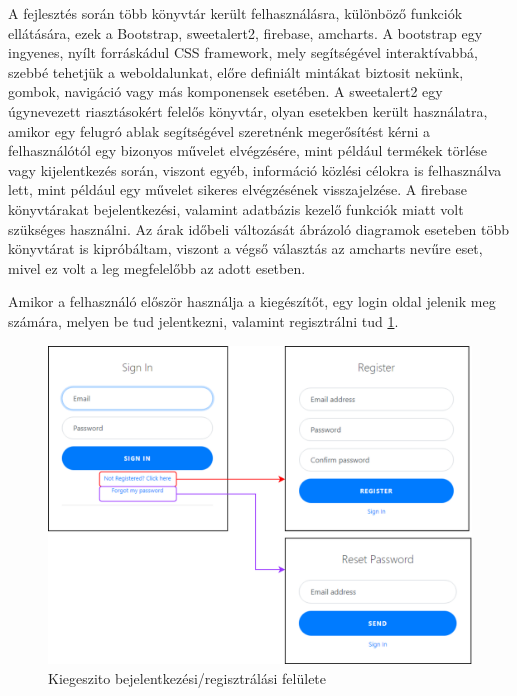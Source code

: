 A fejlesztés során több könyvtár került felhasználásra, különböző funkciók ellátására, ezek a Bootstrap, sweetalert2, firebase, amcharts. A bootstrap egy ingyenes, nyílt forráskádul CSS framework, mely segítségével interaktívabbá, szebbé tehetjük a weboldalunkat, előre definiált mintákat biztosit nekünk, gombok, navigáció vagy más komponensek esetében. A sweetalert2 egy úgynevezett riasztásokért felelős könyvtár, olyan esetekben került használatra, amikor egy felugró ablak segítségével szeretnénk megerősítést kérni a felhasználótól egy bizonyos művelet elvégzésére, mint például termékek törlése vagy kijelentkezés során, viszont egyéb, információ közlési célokra is felhasználva lett, mint például egy művelet sikeres elvégzésének visszajelzése. A firebase könyvtárakat bejelentkezési, valamint adatbázis kezelő funkciók miatt volt szükséges használni. Az árak időbeli változását ábrázoló diagramok eseteben több könyvtárat is kipróbáltam, viszont a végső választás az amcharts nevűre eset, mivel ez volt a leg megfelelőbb az adott esetben.

Amikor a felhasználó először használja a kiegészítőt, egy login oldal jelenik meg számára, melyen be tud jelentkezni, valamint regisztrálni tud \ref{fig:ext_login_reg}.

\begin{figure}[H]
    \centering
    \includegraphics[scale=1]{figures/images/login-reg-ext.png}
    \caption{Kiegeszito bejelentkezési/regisztrálási felülete}
    \label{fig:ext_login_reg}
\end{figure}